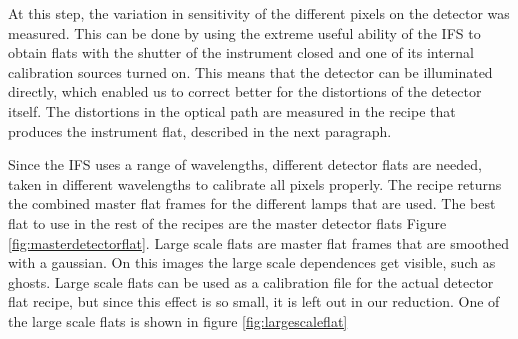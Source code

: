 \documentclass[twoside,single]{lion-msc}
\begin{document}
At this step, the variation in sensitivity of the different pixels on the detector was measured. This can be done by using the extreme useful ability of the IFS to obtain flats with the shutter of the instrument closed and one of its internal calibration sources turned on. This means that the detector can be illuminated directly, which enabled us to correct better for the distortions of the detector itself. The distortions in the optical path are measured in the recipe that produces the instrument flat, described in the next paragraph. 
\bigskip

Since the IFS uses a range of wavelengths, different detector flats are needed, taken in different wavelengths to calibrate all pixels properly. The recipe returns the combined master flat frames for the different lamps that are used. The best flat to use in the rest of the recipes are the master detector flats Figure \ref{fig:masterdetectorflat}. Large scale flats are master flat frames that are smoothed with a gaussian. On this images the large scale dependences get visible, such as ghosts. Large scale flats can be used as a calibration file for the actual detector flat recipe, but since this effect is so small, it is left out in our reduction. One of the large scale flats is shown in figure \ref{fig:largescaleflat}
\end{document}
